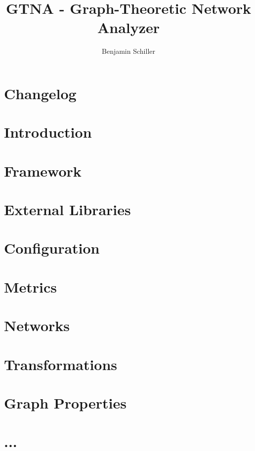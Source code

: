 \documentclass[11pt]{amsart}
\title{GTNA - Graph-Theoretic Network Analyzer}
\author{Benjamin Schiller}
\begin{document}
\maketitle

\tableofcontents


\section*{Changelog}

\section{Introduction}

\section{Framework}

\section{External Libraries}

\section{Configuration}

\section{Metrics}

\section{Networks}

\section{Transformations}

\section{Graph Properties}

\section{...}
\end{document}
